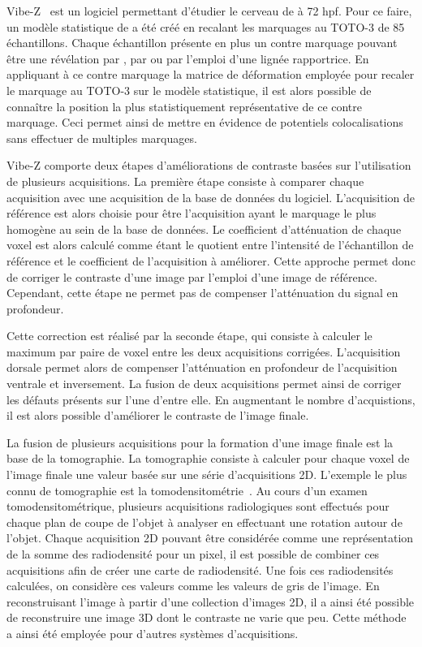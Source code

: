 \documentclass[\main/main.tex]{subfiles}
\begin{document}
%
Vibe-Z~\cite{ronneberger_2015} est un logiciel permettant d'étudier le cerveau de \pz{} à 72 hpf.
%
Pour ce faire, un modèle statistique de \pz{} a été créé en recalant les marquages au TOTO-3 de 85 échantillons.
%
Chaque échantillon présente en plus un contre marquage pouvant être une révélation par \fish{}, par \ihcie{} ou par l'emploi d'une lignée rapportrice. 
%
En appliquant à ce contre marquage la matrice de déformation employée pour recaler le marquage au TOTO-3 sur le modèle statistique, il est alors possible de connaître la position la plus statistiquement représentative de ce contre marquage.
%
Ceci permet ainsi de mettre en évidence de potentiels colocalisations sans effectuer de multiples marquages.

%
Vibe-Z comporte deux étapes d'améliorations de contraste basées sur l'utilisation de plusieurs acquisitions. La première étape consiste à comparer chaque acquisition avec une acquisition de la base de données du logiciel.
%
L'acquisition de référence est alors choisie pour être l'acquisition ayant le marquage le plus homogène au sein de la base de données.
%
Le coefficient d'atténuation de chaque voxel est alors calculé comme étant le quotient entre l'intensité de l'échantillon de référence et le coefficient de l'acquisition à améliorer.
%
Cette approche permet donc de corriger le contraste d'une image par l'emploi d'une image de référence.
%
Cependant, cette étape ne permet pas de compenser l'atténuation du signal en profondeur.

%
Cette correction est réalisé par la seconde étape, qui consiste à calculer le maximum par paire de voxel entre les deux acquisitions corrigées.
%
L'acquisition dorsale permet alors de compenser l'atténuation en profondeur de l'acquisition ventrale et inversement.
%
La fusion de deux acquisitions permet ainsi de corriger les défauts présents sur l'une d'entre elle.
%
En augmentant le nombre d'acquistions, il est alors possible d'améliorer le contraste de l'image finale.

%
La fusion de plusieurs acquisitions pour la formation d'une image finale est la base de la tomographie.
%
La tomographie consiste à calculer pour chaque voxel de l'image finale une valeur basée sur une série d'acquisitions 2D.
%
L'exemple le plus connu de tomographie est la tomodensitométrie~\cite{hounsfield_1973}.
%
Au cours d'un examen tomodensitométrique, plusieurs acquisitions radiologiques sont effectués pour chaque plan de coupe de l'objet à analyser en effectuant une rotation autour de l'objet.
%
Chaque acquisition 2D pouvant être considérée comme une représentation de la somme des radiodensité pour un pixel,
il est possible de combiner ces acquisitions afin de créer une carte de radiodensité.
%
Une fois ces radiodensités calculées, on considère ces valeurs comme les valeurs de gris de l'image.
%
En reconstruisant l'image à partir d'une collection d'images 2D, il a ainsi été possible de reconstruire une image 3D dont le contraste ne varie que peu.
%
Cette méthode a ainsi été employée pour d'autres systèmes d'acquisitions.
\end{document}
